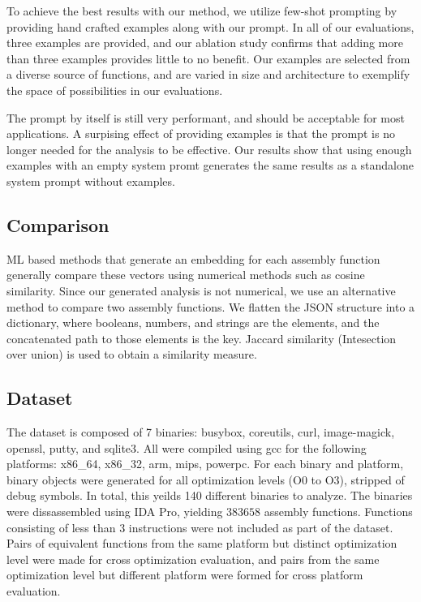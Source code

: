 \documentclass[conference,compsoc]{IEEEtran}
\begin{document}
To achieve the best results with our method, we utilize few-shot prompting by providing hand crafted examples along with our prompt.
In all of our evaluations, three examples are provided, and our ablation study confirms that adding more than three examples provides
little to no benefit. Our examples are selected from a diverse source of functions, and are varied in size and architecture to
exemplify the space of possibilities in our evaluations.

The prompt by itself is still very performant, and should be acceptable for most applications. A surpising effect of providing examples
is that the prompt is no longer needed for the analysis to be effective. Our results show that using enough examples with an empty system promt
generates the same results as a standalone system prompt without examples.

\subsection{Comparison}

ML based methods that generate an embedding for each assembly function generally compare these vectors using numerical
methods such as cosine similarity.  Since our generated analysis is not numerical, we use an alternative
method to compare two assembly functions.  We flatten the JSON structure into a dictionary, where booleans, numbers, and
strings are the elements, and the concatenated path to those elements is the key.  Jaccard similarity (Intesection over union)
is used to obtain a similarity measure.

\subsection{Dataset}

The dataset is composed of 7 binaries: busybox, coreutils, curl, image-magick, openssl, putty, and sqlite3.
All were compiled using gcc for the following platforms: x86\_64, x86\_32, arm, mips, powerpc.
For each binary and platform, binary objects were generated for all optimization levels (O0 to O3),
stripped of debug symbols. In total, this yeilds 140 different binaries to analyze.
The binaries were dissassembled using IDA Pro, yielding \(383 658\) assembly functions.
Functions consisting of less than 3 instructions were not included as part of the dataset.
Pairs of equivalent functions from the same platform but distinct optimization level were made for cross optimization
evaluation, and pairs from the same optimization level but different platform were formed for cross
platform evaluation.
\end{document}
